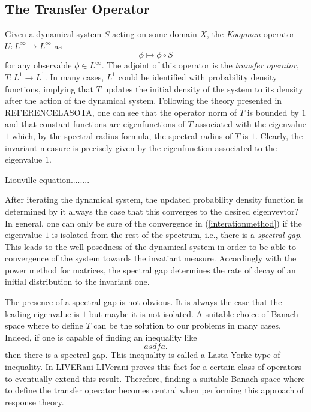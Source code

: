 \subsection*{The Transfer Operator}

Given a dynamical system $S$ acting on some domain $X$, the \emph{Koopman} operator $U:L^{\infty}\longrightarrow L^{\infty}$ as
\begin{equation}
	\phi \mapsto \phi \circ S
\end{equation}
for any observable $\phi \in L^{\infty}$. The adjoint of this operator is the \emph{transfer operator}, $T:L^1 \longrightarrow L^1$. In many cases, $L^1$ could be identified with probability density functions, implying that $T$ updates the initial density of the system to its density after the action of the dynamical system. Following the theory presented in REFERENCELASOTA, one can see that the operator norm of $T$ is bounded by $1$ and that constant functions are eigenfunctions of $T$ associated with the eigenvalue $1$ which, by the spectral radius formula, the spectral radius of $T$ is $1$. Clearly, the invariant measure is precisely given by the eigenfunction associated to the eigenvalue $1$.

Liouville equation........

After iterating the dynamical system, the updated probability density function is determined by  it always the case that this converges to the desired eigenvevtor? In general, one can only be sure of the convergence in (\ref{interationmethod}) if the eigenvalue $1$ is isolated from the rest of the spectrum, i.e., there is a \emph{spectral gap}. This leads to the well posedness of the dynamical system in order to be able to convergence of the system towards the invatiant measure. Accordingly with the power method for matrices, the spectral gap determines the rate of decay of an initial distribution to the invariant one.

The presence of a spectral gap is not obvious. It is always the case that the leading eigenvalue is $1$ but maybe it is not isolated. A suitable choice of Banach space where to define $T$ can be the solution to our problems in many cases. Indeed, if one is capable of finding an inequality like
\begin{equation}\label{lasotayorke}
	asdfa.
\end{equation}
then there is a spectral gap. This inequality is called a Lasta-Yorke type of inequality. In LIVERani LIVerani proves this fact for a certain class of operators to eventually extend this result. Therefore, finding a suitable Banach space where to define the transfer operator becomes central when performing this approach of response theory.

